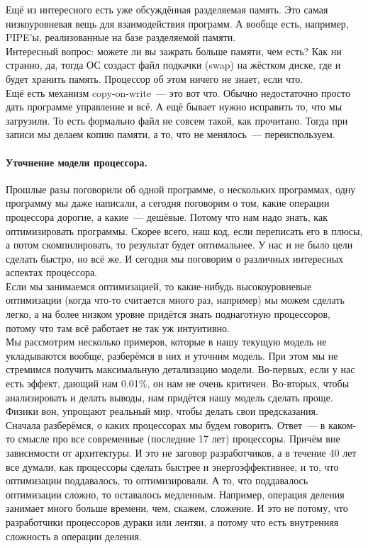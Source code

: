 \documentclass{article}
\begin{document}
    Ещё из интересного есть уже обсуждённая разделяемая память. Это самая низкоуровневая вещь для взаимодействия программ. А вообще есть, например, PIPE'ы, реализованные на базе разделяемой памяти.\\
    Интересный вопрос: можете ли вы зажрать больше памяти, чем есть? Как ни странно, да, тогда ОС создаст файл подкачки (swap) на жёстком диске, где и будет хранить память. Процессор об этом ничего не знает, если что.\\
    Ещё есть механизм copy-on-write~--- это вот что. Обычно недостаточно просто дать программе управление и всё. А ещё бывает нужно исправить то, что мы загрузили. То есть формально файл не совсем такой, как прочитано. Тогда при записи мы делаем копию памяти, а то, что не менялось~--- переиспользуем.
    \paragraph{Уточнение модели процессора.}
    Прошлые разы поговорили об одной программе, о нескольких программах, одну программу мы даже написали, а сегодня поговорим о том, какие операции процессора дорогие, а какие~--- дешёвые. Потому что нам надо знать, как оптимизировать программы. Скорее всего, наш код, если переписать его в плюсы, а потом скомпилировать, то результат будет оптимальнее. У нас и не было цели сделать быстро, но всё же. И сегодня мы поговорим о различных интересных аспектах процессора.\\
    Если мы занимаемся оптимизацией, то какие-нибудь высокоуровневые оптимизации (когда что-то считается много раз, например) мы можем сделать легко, а на более низком уровне придётся знать поднаготную процессоров, потому что там всё работает не так уж интуитивно.\\
    Мы рассмотрим несколько примеров, которые в нашу текущую модель не укладываются вообще, разберёмся в них и уточним модель. При этом мы не стремимся получить максимальную детализацию модели. Во-первых, если у нас есть эффект, дающий нам 0.01\%, он нам не очень критичен. Во-вторых, чтобы анализировать и делать выводы, нам придётся нашу модель сделать проще. Физики вон, упрощают реальный мир, чтобы делать свои предсказания.\\
    Сначала разберёмся, о каких процессорах мы будем говорить. Ответ~--- в каком-то смысле про все современные (последние 17 лет) процессоры. Причём вне зависимости от архитектуры. И это не заговор разработчиков, а в течение 40 лет все думали, как процессоры сделать быстрее и энергоэффективнее, и то, что оптимизации поддавалось, то оптимизировали. А то, что поддавалось оптимизации сложно, то оставалось медленным. Например, операция деления занимает много больше времени, чем, скажем, сложение. И это не потому, что разработчики процессоров дураки или лентяи, а потому что есть внутренняя сложность в операции деления.
\end{document}
